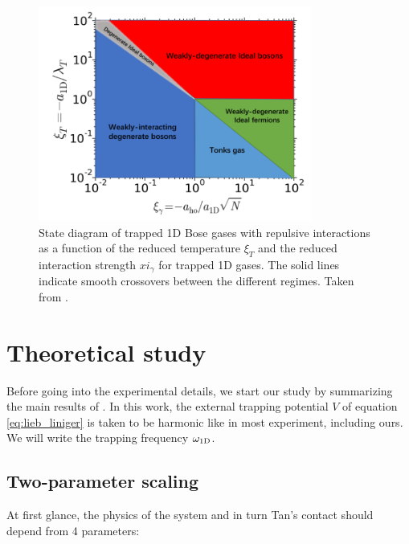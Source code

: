 \begin{figure}
    \centering
    \includegraphics[width=0.8\textwidth]{Fig/Chapter5/state_diagam_hepeng.png}
    \caption[State diagram of trapped 1D Bose gases with repulsive interactions as a function of the reduced temperature $\xi_T$ and the reduced interaction strength $xi_{\gamma}$ for trapped 1D gases]{State diagram of trapped 1D Bose gases with repulsive interactions as a function of the reduced temperature $\xi_T$ and the reduced interaction strength $xi_{\gamma}$ for trapped 1D gases. The solid lines indicate smooth crossovers between the different regimes. Taken from \cite{yao:tel-03065015}.}
    \label{fig:1D_diagram}
\end{figure}


\section{Theoretical study}

\label{sec:1D_theory}

Before going into the experimental details, we start our study by summarizing the main results of \cite{yao2018tan}. In this work, the external trapping potential $V$ of equation \ref{eq:lieb_liniger} is taken to be harmonic like in most experiment, including ours. We will write the trapping frequency $\omega_{\rm{1D}}$. 

\subsection{Two-parameter scaling}

At first glance, the physics of the system and in turn Tan's contact should depend from 4 parameters:

